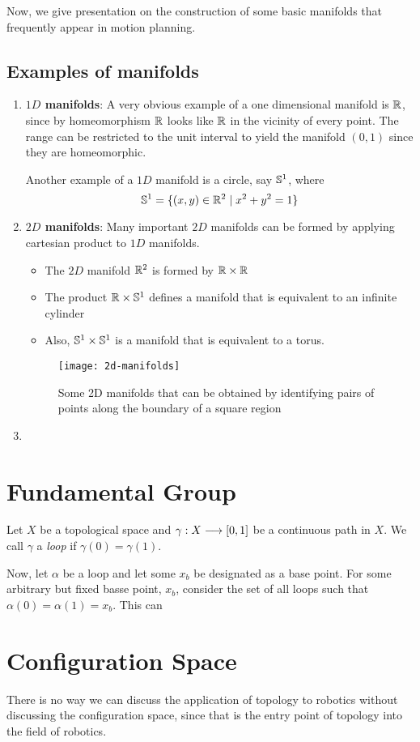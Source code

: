 Now, we give presentation on the construction of some basic manifolds that frequently appear in motion planning.

\subsection{Examples of manifolds}

\begin{enumerate}
    \item \textbf{$1D$ manifolds}: A very obvious example of a one dimensional manifold is $\mathbb{R}$, since by homeomorphism $\mathbb{R}$ looks like $\mathbb{R}$ in the vicinity of every point. The range can be restricted to the unit interval to yield the manifold $(0,1)$ since they are homeomorphic.

    Another example of a $1D$ manifold is a circle, say $\mathbb{S}^1$, where
    \[
        \mathbb{S}^1 = \{(x,y) \in \mathbb{R}^2 \mid x^2 + y^2  = 1\}
    \]
    \item \textbf{$2D$ manifolds}: Many important $2D$ manifolds can be formed by applying cartesian product to $1D$ manifolds. 
    \begin{itemize}
        \item The $2D$ manifold $\mathbb{R}^2$ is formed by $\mathbb{R} \times \mathbb{R}$ 
        \item The product $\mathbb{R} \times \mathbb{S}^1$ defines a manifold that is equivalent to an infinite cylinder
        \item Also, $\mathbb{S}^1 \times \mathbb{S}^1$ is a manifold that is equivalent to a torus.
    \end{itemize}
    \begin{figure}[H]
        \centering
        \texttt{[image: 2d-manifolds]}
        \caption{Some 2D manifolds that can be obtained by identifying pairs of points along the boundary of a square region}
    \end{figure}
    \item 
\end{enumerate}


\section{Fundamental Group}
\begin{defn}[Loop]
    Let $X$ be a topological space and $\gamma : X \longrightarrow [0,1]$ be a continuous path in $X$. We call $\gamma$ a \textit{loop} if $\gamma(0) = \gamma(1)$.
\end{defn}

Now, let $\alpha$ be a loop and let some $x_b$ be designated as a base point. For some arbitrary but fixed basse point, $x_b$, consider the set of all loops such that $\alpha(0) = \alpha(1) = x_b$. This can 

\section{Configuration Space}
There is no way we can discuss the application of topology to robotics without discussing the configuration space, since that is the entry point of topology into the field of robotics.
